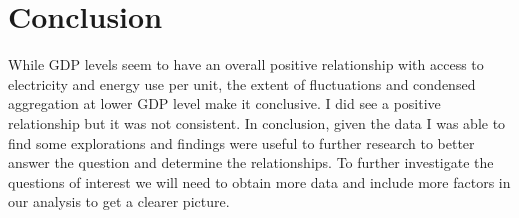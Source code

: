 \documentclass{article}
\begin{document}
\section{Conclusion}

While GDP levels seem to have an overall positive relationship with access to electricity and energy use per unit, the extent of fluctuations and condensed aggregation at lower GDP level make it conclusive. I did see a positive relationship but it was not consistent.  In conclusion, given the data I was able to find some explorations and findings were useful to further research to better answer the question and determine the relationships. To further investigate the questions of interest we will need to obtain more data and include more factors in our analysis to get a clearer picture. 
\end{document}

